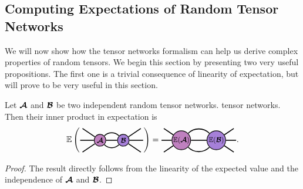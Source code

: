 \subsection{Computing Expectations of Random Tensor Networks} 
We will now show how the tensor networks formalism can help us derive complex properties of random tensors. 
We begin this section by presenting two very useful propositions.
The first one is a trivial consequence of linearity of expectation, but will prove to be very useful in this section.
\begin{proposition}\label{prop:inner-expectation}
    Let $\bm{\mathcal{A}}$ and $\bm{\mathcal{B}}$ be two independent random tensor networks. tensor networks. Then their inner product in expectation is 
$$\EE\left(\begin{tikzpicture}[baseline=\baseline]
    \tikzset{tensor/.style = {minimum size = 0.5cm,shape = circle,thick,draw=black,inner sep = 0pt}, edge/.style = {thick,line width=.4mm},every loop/.style={}}
    \def\y{0}
    \def\x{0}
    \node[tensor,fill=red!50!blue!50!white] (At) at (\x,\y){\scalebox{0.85}{$\At$}};
    \node[tensor,fill=red!30!blue!50!white] (Bt) at (\x+1,\y){\scalebox{0.85}{$\Bt$}};
    \draw[edge] (At) -- (Bt);
    \draw[edge] (At) to [out=45,in=135] (Bt);
    \draw[edge] (At) to [out=-45,in=-135] (Bt);
    \draw[edge](At)--(\x-0.85,\y);
    \draw[edge](At)--(\x-0.75,\y+0.5);    \draw[edge](At)--(\x-0.75,\y-0.5);
    \draw[edge](Bt)--(\x+1.85,\y);
    \draw[edge](Bt)--(\x+1.75,\y+0.5);    \draw[edge](Bt)--(\x+1.75,\y-0.5);
\end{tikzpicture} \right)
=
\begin{tikzpicture}[baseline=\baseline]
    \tikzset{tensor/.style = {minimum size = 0.8cm,shape = circle,thick,draw=black,inner sep = 0pt}, edge/.style = {thick,line width=.4mm},every loop/.style={}}
    \def\y{0}
    \def\x{0}
    \node[tensor,fill=red!50!blue!50!white] (At) at (\x,\y){\scalebox{0.85}{$\EE(\At)$}};
    \node[tensor,fill=red!30!blue!50!white] (Bt) at (\x+1.5,\y){\scalebox{0.85}{$\EE(\Bt)$}};
    \draw[edge] (At) -- (Bt);
    \draw[edge] (At) to [out=45,in=135] (Bt);
    \draw[edge] (At) to [out=-45,in=-135] (Bt);
    \draw[edge](At)--(\x-0.85,\y);
    \draw[edge](At)--(\x-0.75,\y+0.5);    \draw[edge](At)--(\x-0.75,\y-0.5);
    \draw[edge](Bt)--(\x+2.35,\y);
    \draw[edge](Bt)--(\x+2.25,\y+0.5);    \draw[edge](Bt)--(\x+2.25,\y-0.5);
\end{tikzpicture}.
$$
\begin{proof}
The result directly follows from the linearity of the expected value and the independence of $\bm{\mathcal{A}}$ and $\bm{\mathcal{B}}$.
\end{proof}
\end{proposition}
